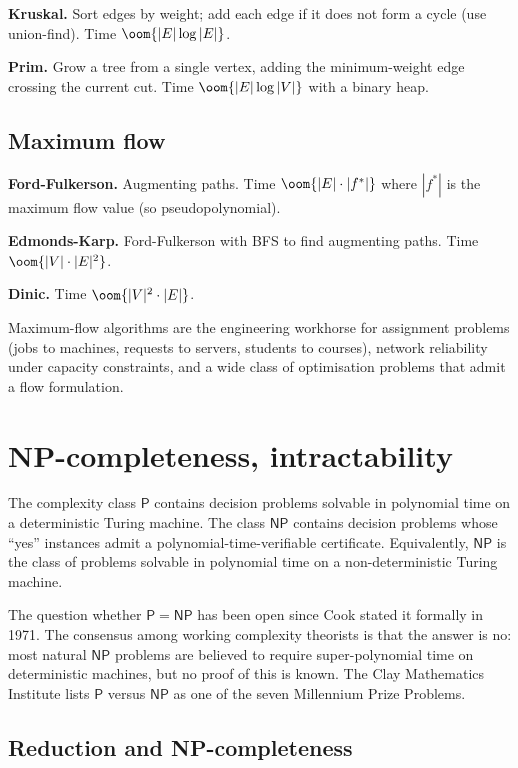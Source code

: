 \textbf{Kruskal.} Sort edges by weight; add each edge if it does not form a cycle (use union-find). Time $\oom{|E| \log |E|}$.

\textbf{Prim.} Grow a tree from a single vertex, adding the minimum-weight edge crossing the current cut. Time $\oom{|E| \log |V|}$ with a binary heap.

\subsection{Maximum flow}

\textbf{Ford-Fulkerson.} Augmenting paths. Time $\oom{|E| \cdot |f^*|}$ where $|f^*|$ is the maximum flow value (so pseudopolynomial).

\textbf{Edmonds-Karp.} Ford-Fulkerson with BFS to find augmenting paths. Time $\oom{|V| \cdot |E|^2}$.

\textbf{Dinic.} Time $\oom{|V|^2 \cdot |E|}$.

Maximum-flow algorithms are the engineering workhorse for assignment problems (jobs to machines, requests to servers, students to courses), network reliability under capacity constraints, and a wide class of optimisation problems that admit a flow formulation.

\section{NP-completeness, intractability}

The complexity class $\mathsf{P}$ contains decision problems solvable in polynomial time on a deterministic Turing machine. The class $\mathsf{NP}$ contains decision problems whose ``yes'' instances admit a polynomial-time-verifiable certificate. Equivalently, $\mathsf{NP}$ is the class of problems solvable in polynomial time on a non-deterministic Turing machine.

The question whether $\mathsf{P} = \mathsf{NP}$ has been open since Cook stated it formally in 1971. The consensus among working complexity theorists is that the answer is no: most natural $\mathsf{NP}$ problems are believed to require super-polynomial time on deterministic machines, but no proof of this is known. The Clay Mathematics Institute lists $\mathsf{P}$ versus $\mathsf{NP}$ as one of the seven Millennium Prize Problems.

\subsection{Reduction and NP-completeness}


